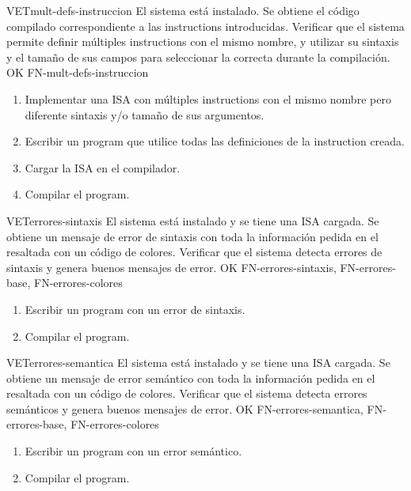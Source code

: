 \begin{testCase}{VET}{mult-defs-instruccion}
    {El sistema está instalado.} %
    {Se obtiene el código compilado correspondiente a las \glspl{instruction} introducidas.} %
    {Verificar que el sistema permite definir múltiples \glspl{instruction} con
    el mismo nombre, y utilizar su sintaxis y el tamaño de sus campos para
    seleccionar la correcta durante la compilación.} %
    {OK} %
    {FN-mult-defs-instruccion} %
    \begin{enumerate}[leftmargin=*, topsep=0pt, noitemsep] %
        \item Implementar una \gls{ISA} con múltiples \glspl{instruction} con el
        mismo nombre pero diferente sintaxis y/o tamaño de sus argumentos.
        \item Escribir un \gls{program} que utilice todas las definiciones de la
        \gls{instruction} creada.
        \item Cargar la \gls{ISA} en el compilador.
        \item Compilar el \gls{program}.
    \end{enumerate}
\end{testCase}

\begin{testCase}{VET}{errores-sintaxis}
    {El sistema está instalado y se tiene una \gls{ISA} cargada.} %
    {Se obtiene un mensaje de error de sintaxis con toda la información pedida en el  resaltada con un código de colores.} %
    {Verificar que el sistema detecta errores de sintaxis y genera buenos mensajes de error.} %
    {OK} %
    {FN-errores-sintaxis, FN-errores-base, FN-errores-colores} %
    \begin{enumerate}[leftmargin=*, topsep=0pt, noitemsep] %
        \item Escribir un \gls{program} con un error de sintaxis.
        \item Compilar el \gls{program}.
    \end{enumerate}
\end{testCase}

\begin{testCase}{VET}{errores-semantica}
    {El sistema está instalado y se tiene una \gls{ISA} cargada.} %
    {Se obtiene un mensaje de error semántico con toda la información pedida en el  resaltada con un código de colores.} %
    {Verificar que el sistema detecta errores semánticos y genera buenos mensajes de error.} %
    {OK} %
    {FN-errores-semantica, FN-errores-base, FN-errores-colores} %
    \begin{enumerate}[leftmargin=*, topsep=0pt, noitemsep] %
        \item Escribir un \gls{program} con un error semántico.
        \item Compilar el \gls{program}.
    \end{enumerate}
\end{testCase}

